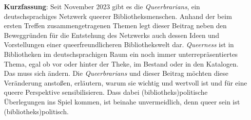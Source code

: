 \textbf{Kurzfassung}: Seit November 2023 gibt es die \textit{Queerbrarians}, ein 
deutschsprachiges Netzwerk queerer Bibliotheksmenschen. Anhand der beim 
ersten Treffen zusammengetragenen Themen legt dieser Beitrag neben den Beweggründen 
für die Entstehung des Netzwerks auch dessen Ideen und Vorstellungen einer 
queerfreundlicheren Bibliothekswelt dar. \textit{Queerness} ist in Bibliotheken im 
deutschsprachigen Raum ein noch immer unterrepräsentiertes Thema, egal ob vor 
oder hinter der Theke, im Bestand oder in den Katalogen. Das muss sich ändern. 
Die \textit{Queerbrarians} und dieser Beitrag möchten diese Veränderung anstoßen, erläutern, 
warum sie wichtig und wertvoll ist und für eine queere Perspektive sensibilisieren. 
Dass dabei (bibliotheks)politische Überlegungen ins Spiel kommen, ist beinahe 
unvermeidlich, denn queer sein ist (bibliotheks)politisch.